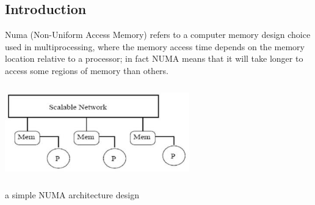 \documentclass[a4paper,10pt]{article}
\makeatletter
\newenvironment{figurehere}{\def\@captype{figure}\vspace{2ex}}{\vspace{2ex}}
\makeatother
\begin{document}
\vspace{4ex}	%
\begin{multicols}{2}

\section{Introduction}

Numa (Non-Uniform Access Memory) refers to a computer memory design choice used in multiprocessing, where the memory access time depends on the memory location relative to a processor; in fact NUMA means that it will take longer to access some regions of memory than others.

\begin{figurehere}
 \centering
 \includegraphics[width=8cm, height=4cm]{./eps/numa.jpg}
 \caption{a simple NUMA architecture design}
 \label{fig:numa}
\end{figurehere}


\end{multicols}
\end{document}
